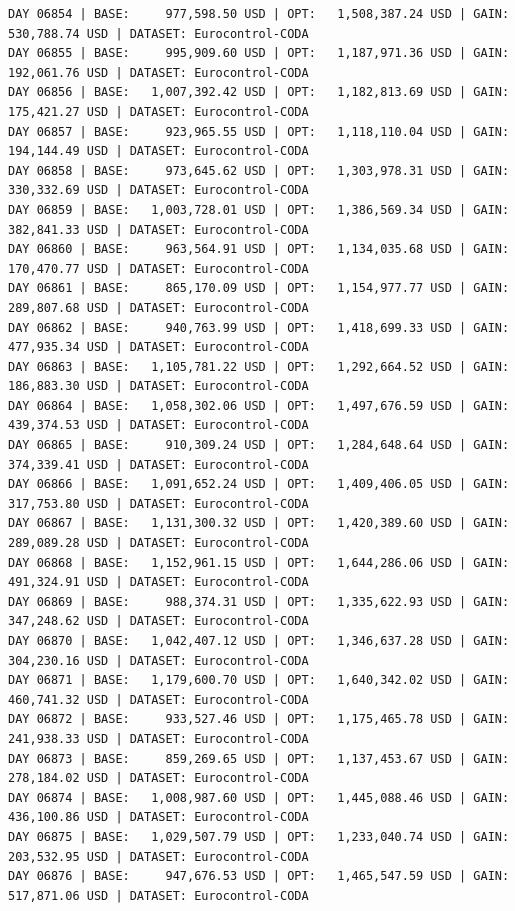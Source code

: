 \documentclass[11pt,a4paper]{article}
\begin{document}
\begin{verbatim}
DAY 06854 | BASE:     977,598.50 USD | OPT:   1,508,387.24 USD | GAIN: 530,788.74 USD | DATASET: Eurocontrol-CODA
DAY 06855 | BASE:     995,909.60 USD | OPT:   1,187,971.36 USD | GAIN: 192,061.76 USD | DATASET: Eurocontrol-CODA
DAY 06856 | BASE:   1,007,392.42 USD | OPT:   1,182,813.69 USD | GAIN: 175,421.27 USD | DATASET: Eurocontrol-CODA
DAY 06857 | BASE:     923,965.55 USD | OPT:   1,118,110.04 USD | GAIN: 194,144.49 USD | DATASET: Eurocontrol-CODA
DAY 06858 | BASE:     973,645.62 USD | OPT:   1,303,978.31 USD | GAIN: 330,332.69 USD | DATASET: Eurocontrol-CODA
DAY 06859 | BASE:   1,003,728.01 USD | OPT:   1,386,569.34 USD | GAIN: 382,841.33 USD | DATASET: Eurocontrol-CODA
DAY 06860 | BASE:     963,564.91 USD | OPT:   1,134,035.68 USD | GAIN: 170,470.77 USD | DATASET: Eurocontrol-CODA
DAY 06861 | BASE:     865,170.09 USD | OPT:   1,154,977.77 USD | GAIN: 289,807.68 USD | DATASET: Eurocontrol-CODA
DAY 06862 | BASE:     940,763.99 USD | OPT:   1,418,699.33 USD | GAIN: 477,935.34 USD | DATASET: Eurocontrol-CODA
DAY 06863 | BASE:   1,105,781.22 USD | OPT:   1,292,664.52 USD | GAIN: 186,883.30 USD | DATASET: Eurocontrol-CODA
DAY 06864 | BASE:   1,058,302.06 USD | OPT:   1,497,676.59 USD | GAIN: 439,374.53 USD | DATASET: Eurocontrol-CODA
DAY 06865 | BASE:     910,309.24 USD | OPT:   1,284,648.64 USD | GAIN: 374,339.41 USD | DATASET: Eurocontrol-CODA
DAY 06866 | BASE:   1,091,652.24 USD | OPT:   1,409,406.05 USD | GAIN: 317,753.80 USD | DATASET: Eurocontrol-CODA
DAY 06867 | BASE:   1,131,300.32 USD | OPT:   1,420,389.60 USD | GAIN: 289,089.28 USD | DATASET: Eurocontrol-CODA
DAY 06868 | BASE:   1,152,961.15 USD | OPT:   1,644,286.06 USD | GAIN: 491,324.91 USD | DATASET: Eurocontrol-CODA
DAY 06869 | BASE:     988,374.31 USD | OPT:   1,335,622.93 USD | GAIN: 347,248.62 USD | DATASET: Eurocontrol-CODA
DAY 06870 | BASE:   1,042,407.12 USD | OPT:   1,346,637.28 USD | GAIN: 304,230.16 USD | DATASET: Eurocontrol-CODA
DAY 06871 | BASE:   1,179,600.70 USD | OPT:   1,640,342.02 USD | GAIN: 460,741.32 USD | DATASET: Eurocontrol-CODA
DAY 06872 | BASE:     933,527.46 USD | OPT:   1,175,465.78 USD | GAIN: 241,938.33 USD | DATASET: Eurocontrol-CODA
DAY 06873 | BASE:     859,269.65 USD | OPT:   1,137,453.67 USD | GAIN: 278,184.02 USD | DATASET: Eurocontrol-CODA
DAY 06874 | BASE:   1,008,987.60 USD | OPT:   1,445,088.46 USD | GAIN: 436,100.86 USD | DATASET: Eurocontrol-CODA
DAY 06875 | BASE:   1,029,507.79 USD | OPT:   1,233,040.74 USD | GAIN: 203,532.95 USD | DATASET: Eurocontrol-CODA
DAY 06876 | BASE:     947,676.53 USD | OPT:   1,465,547.59 USD | GAIN: 517,871.06 USD | DATASET: Eurocontrol-CODA

\end{verbatim}
\end{document}
